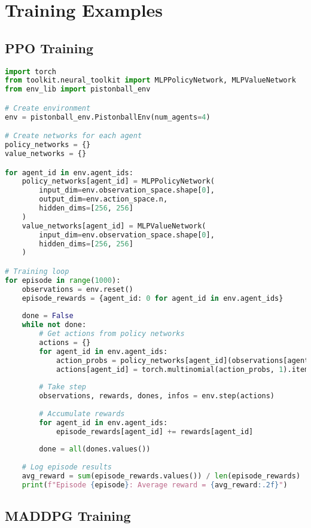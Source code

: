 \section{Training Examples}

\subsection{PPO Training}

\begin{lstlisting}[language=python, caption=PPO Training Example]
import torch
from toolkit.neural_toolkit import MLPPolicyNetwork, MLPValueNetwork
from env_lib import pistonball_env

# Create environment
env = pistonball_env.PistonballEnv(num_agents=4)

# Create networks for each agent
policy_networks = {}
value_networks = {}

for agent_id in env.agent_ids:
    policy_networks[agent_id] = MLPPolicyNetwork(
        input_dim=env.observation_space.shape[0],
        output_dim=env.action_space.n,
        hidden_dims=[256, 256]
    )
    value_networks[agent_id] = MLPValueNetwork(
        input_dim=env.observation_space.shape[0],
        hidden_dims=[256, 256]
    )

# Training loop
for episode in range(1000):
    observations = env.reset()
    episode_rewards = {agent_id: 0 for agent_id in env.agent_ids}
    
    done = False
    while not done:
        # Get actions from policy networks
        actions = {}
        for agent_id in env.agent_ids:
            action_probs = policy_networks[agent_id](observations[agent_id])
            actions[agent_id] = torch.multinomial(action_probs, 1).item()
        
        # Take step
        observations, rewards, dones, infos = env.step(actions)
        
        # Accumulate rewards
        for agent_id in env.agent_ids:
            episode_rewards[agent_id] += rewards[agent_id]
        
        done = all(dones.values())
    
    # Log episode results
    avg_reward = sum(episode_rewards.values()) / len(episode_rewards)
    print(f"Episode {episode}: Average reward = {avg_reward:.2f}")
\end{lstlisting}

\subsection{MADDPG Training}

